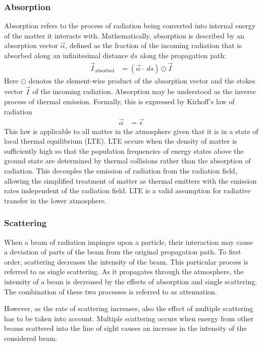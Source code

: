 \subsubsection{Absorption}

Absorption refers to the process of radiation being converted into internal
energy of the matter it interacts with. Mathematically, absorption is described
by an absorption vector $\vec{\alpha}$, defined as the fraction of the incoming
radiation that is absorbed along an infinitesimal distance $ds$ along the
propagation path:
\begin{align}
\vec{I}_\text{absorbed} &= (\vec{\alpha} \cdot\ ds) \odot \vec{I}
\end{align}
Here $\odot$ denotes the element-wise product of the absorption vector and
the stokes vector $\vec{I}$ of the incoming radiation. Absorption may be
understood as the inverse process of thermal emission. Formally, this is
expressed by Kirhoff's  law of radiation
\begin{align}
  \vec{\alpha} &= \vec{\epsilon}
\end{align}
This law is applicable to all matter in the atmosphere given that it is in a
state of local thermal equilibrium (LTE). LTE occurs when the density of matter
is sufficiently high so that the population frequencies of energy states above
the ground state are determined by thermal collisions rather than the absorption
of radiation. This decouples the emission of radiation from the radiation field,
allowing the simplified treatment of matter as thermal emitters with the
emission rates independent of the radiation field. LTE is a valid assumption for
radiative transfer in the lower atmosphere.

\subsubsection{Scattering}

When a beam of radiation impinges upon a particle, their interaction may cause a
deviation of parts of the beam from the original propagation path. To first
order, scattering decreases the intensity of the beam. This particular process
is referred to as single scattering. As it propagates through the atmosphere,
the intensity of a beam is decreased by the effects of absorption and single
scattering. The combination of these two processes is referred to as
attenuation.

However, as the rate of scattering increases, also the effect of multiple
scattering has to be taken into account. Multiple scattering occurs when energy
from other beams scattered into the line of sight causes an increase in the
intensity of the considered beam.

